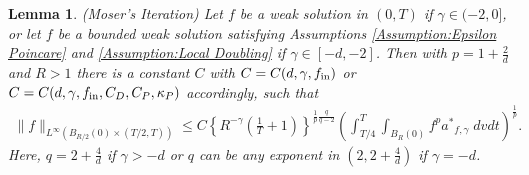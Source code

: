 \documentclass[12pt,american]{amsart}
\numberwithin{equation}{section}
\theoremstyle{plain}
\newtheorem{lem}[thm]{Lemma}
\theoremstyle{definition}                  %
\def\astar{{a^*}}
\def\fin{f_{\textnormal{in}}}
\begin{document}
\begin{lem}\label{lem:weighted Moser estimate}{(Moser's Iteration)}
 Let $f$ be a weak solution in $(0,T)$ if $\gamma \in (-2,0]$, or let $f$ be a bounded weak solution satisfying Assumptions \ref{Assumption:Epsilon Poincare} and \ref{Assumption:Local Doubling} if $\gamma \in [-d,-2]$.	Then with $p=1+\tfrac{2}{d}$ and $R>1$ there is a constant $C$ with $C=C(d,\gamma,\fin)$ or $C=C(d,\gamma,\fin,C_D,C_P,\kappa_P)$ accordingly, such that
\begin{align*}
   \|f\|_{L^\infty(B_{R/2}(0)\times (T/2,T))} \leq C\left \{ R^{-\gamma}\left (\frac{1}{T}+1 \right ) \right \}^{\frac{1}{p}\frac{q}{q-2}}\left (\int_{T/4}^T \int_{B_R(0)} f^{p}\astar_{f,\gamma} \;dvdt \right )^{\frac{1}{p}}.
\end{align*}
Here, $q = 2+\frac{4}{d}$ if $\gamma>-d$ or $q$ can be any exponent in $(2,2+\frac{4}{d})$ if $\gamma=-d$.
\end{lem}
\end{document}
